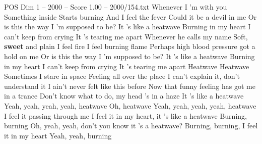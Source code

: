 \begin{textsample}{POS Dim 1 – 2000 – Score 1.00 – 2000/154.txt}  \label{ex:f1_pos_031}
Whenever I 'm with you Something inside Starts burning And I feel the fever Could it be a devil in me Or is this the way I 'm supposed to be?
It 's like a heatwave Burning in my heart I can't keep from crying It 's tearing me apart Whenever he calls my name Soft, \textbf{sweet} and plain I feel fire I feel burning flame Perhaps high blood pressure got a hold on me Or is this the way I 'm supposed to be?
It 's like a heatwave Burning in my heart I can't keep from crying It 's tearing me apart Heatwave Heatwave Sometimes I stare in space Feeling all over the place I can't explain it, don't understand it I ain't never felt like this before Now that funny feeling has got me in a trance Don't know what to do, my head 's in a haze It 's like a heatwave Yeah, yeah, yeah, yeah, heatwave Oh, heatwave Yeah, yeah, yeah, yeah, heatwave I feel it passing through me I feel it in my heart, it 's like a heatwave Burning, burning Oh, yeah, yeah, don't you know it 's a heatwave?
Burning, burning, I feel it in my heart Yeah, yeah, burning

\end{textsample}
